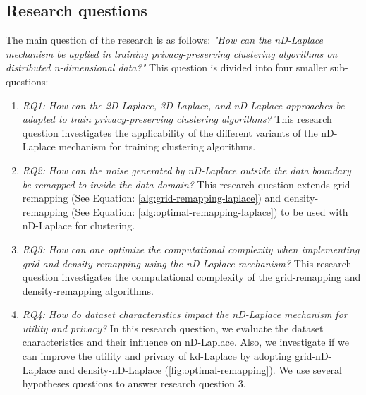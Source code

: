 \subsection{Research questions}
The main question of the research is as follows: \newline \newline
\textit{"How can the nD-Laplace mechanism be applied in training privacy-preserving clustering algorithms on distributed n-dimensional data?"} \newline
This question is divided into four smaller sub-questions:
\begin{enumerate}
      \item \textit{RQ1: How can the 2D-Laplace, 3D-Laplace, and nD-Laplace approaches be adapted to train privacy-preserving clustering algorithms?} \newline
            This research question investigates the applicability of the different variants of the nD-Laplace mechanism for training clustering algorithms.
      \item \textit{RQ2: How can the noise generated by nD-Laplace outside the data boundary be remapped to inside the data domain?} \newline
            This research question extends grid-remapping (See Equation: \ref{alg:grid-remapping-laplace}) and density-remapping (See Equation: \ref{alg:optimal-remapping-laplace}) to be used with nD-Laplace for clustering.
      \item \textit{RQ3: How can one optimize the computational complexity when implementing grid and density-remapping using the nD-Laplace mechanism?} \newline
            This research question investigates the computational complexity of the grid-remapping and density-remapping algorithms.
      \item \textit{RQ4: How do dataset characteristics impact the nD-Laplace mechanism for utility and privacy?} \newline
            In this research question, we evaluate the dataset characteristics and their influence on nD-Laplace.
            Also, we investigate if we can improve the utility and privacy of kd-Laplace by adopting grid-nD-Laplace and density-nD-Laplace (\ref{fig:optimal-remapping}).
            We use several hypotheses questions to answer research question 3.


\end{enumerate}
